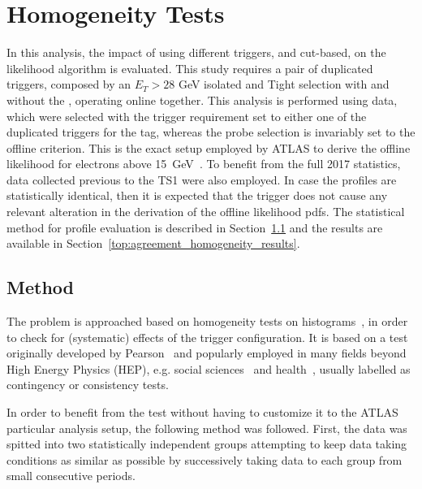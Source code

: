 \FloatBarrier
\section[Homogeneity Tests]{Homogeneity Tests}\label{ssec:agreement}

In this 
analysis, the impact of using different triggers, \rnn{} and cut-based, on the likelihood algorithm is evaluated. This study requires a pair of duplicated triggers, composed by an $E_T > 28$ GeV isolated and Tight selection with and without the \rnn{}, operating online together. 
This analysis is performed using \Zee{} \tnp{} data, which were selected with the trigger requirement set to either one of the duplicated triggers for the tag, whereas the probe selection is invariably set to the offline \vloose{} criterion. This is the exact setup employed by ATLAS to derive the offline likelihood for electrons above \SI{15}{\GeV}~\cite{aaboud2019electron}. To benefit from the full 2017 statistics, data collected previous to the TS1 were also employed. In case the profiles are statistically identical, then it is expected that the \rnn{} trigger does not cause any relevant alteration in the derivation of the offline likelihood pdfs.  The statistical method for profile evaluation is described in Section~\ref{top:homogeneity_method} and the results are available in Section~\ref{top:agreement_homogeneity_results}.




\subsection{Method}\label{top:homogeneity_method}



The problem is approached based on homogeneity tests on histograms~\cite{homogeneity_test}, in order to check for (systematic) effects of the trigger configuration. It is based on a test originally developed by Pearson~\cite{pearson1911probability} and popularly employed in many fields beyond High Energy Physics (HEP), e.g. social sciences~\cite{wickens2014multiway} and health~\cite{ma2015homogeneity}, usually labelled as contingency or consistency tests.

In order to benefit from the test without having to customize it to the ATLAS particular analysis setup, the following method was followed. First, the data was spitted into two
statistically independent groups attempting to keep data taking conditions as
similar as possible by successively taking data to each group from small
consecutive periods.

